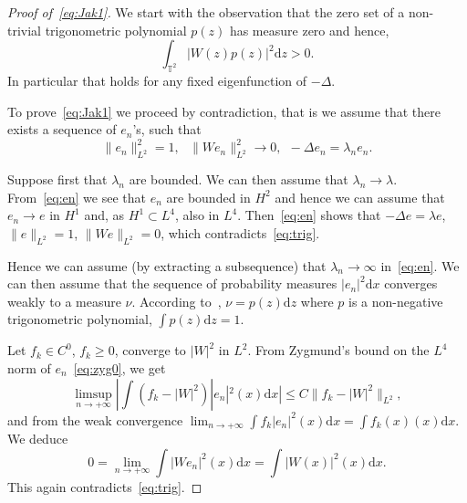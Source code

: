 \documentclass[10pt]{amsart}
\theoremstyle{definition}\newtheorem{defi}[theo]{Definition}\newtheorem{rema}[theo]{Remark}\newtheorem{exam}[theo]{Example}\newtheorem{exem}[theo]{Example}\newtheorem{nota}[theo]{Notation}
\newcommand{\TT}{{\mathbb T}}
\newcommand*{\dd}{\mathrm{d}}
\newcommand*{\dx}{\dd x}
\newcommand*{\dz}{\dd z}
\begin{document}
\begin{proof}[Proof of~\eqref{eq:Jak1}]
We start with the observation that the zero set of a non-trivial trigonometric polynomial $ p (z) $ has measure zero and hence,
\begin{equation}\label{eq:trig}
\int_{\TT^2} | W (z) p(z) |^2 \dz > 0.
\end{equation}
In particular that holds for any fixed eigenfunction of $ - \Delta $.

To prove~\eqref{eq:Jak1} we proceed by contradiction, that is we assume that there exists a sequence of $ e_n $'s, such that
\begin{equation}\label{eq:en}
\|e_n \|_{L^2}^2 = 1, \ \ \ \| W e_n \|_{L^2}^2 \rightarrow 0, \ \ - \Delta e_n =
\lambda_n e_n.
\end{equation}

Suppose first that $ \lambda_n $ are bounded. We can then assume that $ \lambda_n \to \lambda $. From~\eqref{eq:en} we see that $ e_n $ are bounded in $ H^2 $ and hence we can assume that $ e_n \to e $ in $ H^1 $ and, as $ H^1 \subset L^4 $, also in $ L^4 $. Then~\eqref{eq:en} shows that $ -\Delta e = \lambda e$, $ \| e\|_{L^2 } = 1 $, $ \| W e \|_{L^2 } = 0$, which contradicts~\eqref{eq:trig}.

Hence we can assume (by extracting a subsequence) that $ \lambda_n \to \infty $ in~\eqref{eq:en}. We can then assume that the sequence of probability measures $ |e_n|^2 \dx $ converges weakly to a measure $\nu$. According to~\cite[Theorem~1.2]{Jak}, $ \nu = p (z) \dz $ where $ p$ is a non-negative trigonometric polynomial, $ \int p (z) \dz = 1 $.

Let $ f_k\in C^0$, $ f_k \geq 0$, converge to $|W|^2 $ in $L^2$. From Zygmund's bound on the $L^4$ norm of $e_n$~\eqref{eq:zyg0}, we get
\[
\limsup_{n\rightarrow + \infty} | \int (f_k - |W |^2)|e_n|^2 (x) \dx | \leq C \| f_k - |W|^2\|_{L^2},
\]
and from the weak convergence $ \lim_{n\rightarrow + \infty} \int f_k|e_n|^2 (x) \dx = \int f_k (x) (x)\dx.$ We deduce
\[
0= \lim_{n\rightarrow + \infty} \int |W e_n|^2 (x) \dx = \int |W (x)|^2 (x)\dx.
\]
This again contradicts~\eqref{eq:trig}.
\end{proof}
\end{document}
